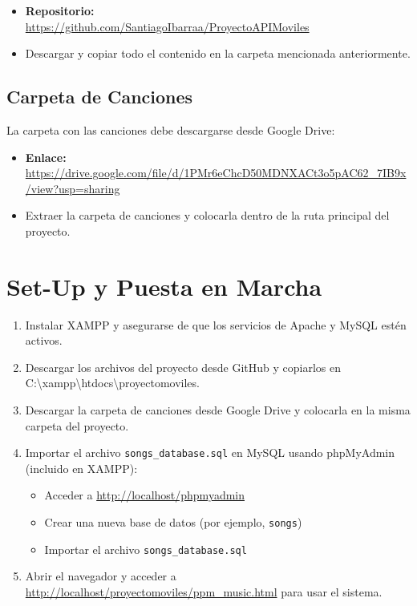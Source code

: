 \documentclass[a4paper,12pt]{article}
\begin{document}
\begin{itemize}
    \item \textbf{Repositorio:} \\ \url{https://github.com/SantiagoIbarraa/ProyectoAPIMoviles}
    \item Descargar y copiar todo el contenido en la carpeta mencionada anteriormente.
\end{itemize}

\subsection{Carpeta de Canciones}\label{subsec:canciones}
La carpeta con las canciones debe descargarse desde Google Drive:

\begin{itemize}
    \item \textbf{Enlace:} \\ \url{https://drive.google.com/file/d/1PMr6eChcD50MDNXACt3o5pAC62_7IB9x/view?usp=sharing}
    \item Extraer la carpeta de canciones y colocarla dentro de la ruta principal del proyecto.
\end{itemize}

\section{Set-Up y Puesta en Marcha}\label{sec:setup}
\begin{enumerate}
    \item Instalar XAMPP y asegurarse de que los servicios de Apache y MySQL estén activos.
    \item Descargar los archivos del proyecto desde GitHub y copiarlos en \\C:\textbackslash xampp\textbackslash htdocs\textbackslash proyectomoviles.
    \item Descargar la carpeta de canciones desde Google Drive y colocarla en la misma carpeta del proyecto.
    \item Importar el archivo \texttt{songs\_database.sql} en MySQL usando phpMyAdmin (incluido en XAMPP):
        \begin{itemize}
            \item Acceder a \url{http://localhost/phpmyadmin}
            \item Crear una nueva base de datos (por ejemplo, \texttt{songs})
            \item Importar el archivo \texttt{songs\_database.sql}
        \end{itemize}
    \item Abrir el navegador y acceder a \url{http://localhost/proyectomoviles/ppm_music.html} para usar el sistema.
\end{enumerate}
\end{document}
